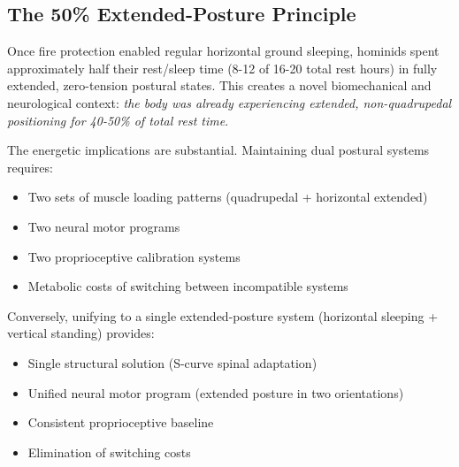 \documentclass[12pt,a4paper]{article}
\begin{document}
\subsection{The 50\% Extended-Posture Principle}

Once fire protection enabled regular horizontal ground sleeping, hominids spent approximately half their rest/sleep time (8-12 of 16-20 total rest hours) in fully extended, zero-tension postural states. This creates a novel biomechanical and neurological context: \textit{the body was already experiencing extended, non-quadrupedal positioning for 40-50\% of total rest time}.

The energetic implications are substantial. Maintaining dual postural systems requires:

\begin{itemize}
\item Two sets of muscle loading patterns (quadrupedal + horizontal extended)
\item Two neural motor programs
\item Two proprioceptive calibration systems
\item Metabolic costs of switching between incompatible systems
\end{itemize}

Conversely, unifying to a single extended-posture system (horizontal sleeping + vertical standing) provides:

\begin{itemize}
\item Single structural solution (S-curve spinal adaptation)
\item Unified neural motor program (extended posture in two orientations)
\item Consistent proprioceptive baseline
\item Elimination of switching costs
\end{itemize}
\end{document}
